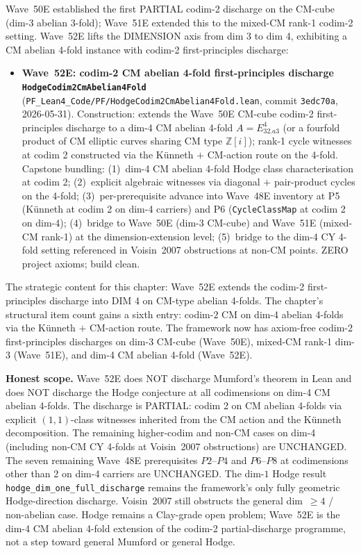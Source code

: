 \begin{remark}\label{rem:hodge-wave52e-lean}
Wave~50E established the first PARTIAL codim-2 discharge on the CM-cube (dim-3 abelian 3-fold); Wave~51E extended this to the mixed-CM rank-1 codim-2 setting. Wave~52E lifts the DIMENSION axis from dim 3 to dim 4, exhibiting a CM abelian 4-fold instance with codim-2 first-principles discharge:
\begin{itemize}
  \item \textbf{Wave~52E: codim-2 CM abelian 4-fold first-principles discharge \texttt{HodgeCodim2CmAbelian4Fold}} (\texttt{PF\_Lean4\_Code/PF/HodgeCodim2CmAbelian4Fold.lean}, commit \texttt{3edc70a}, 2026-05-31). Construction: extends the Wave~50E CM-cube codim-2 first-principles discharge to a dim-4 CM abelian 4-fold $A = E_{32.a3}^4$ (or a fourfold product of CM elliptic curves sharing CM type $\mathbb{Z}[i]$); rank-1 cycle witnesses at codim 2 constructed via the K\"unneth $+$ CM-action route on the 4-fold. Capstone bundling: (1)~dim-4 CM abelian 4-fold Hodge class characterisation at codim 2; (2)~explicit algebraic witnesses via diagonal $+$ pair-product cycles on the 4-fold; (3)~per-prerequisite advance into Wave~48E inventory at P5 (K\"unneth at codim 2 on dim-4 carriers) and P6 (\texttt{CycleClassMap} at codim 2 on dim-4); (4)~bridge to Wave~50E (dim-3 CM-cube) and Wave~51E (mixed-CM rank-1) at the dimension-extension level; (5)~bridge to the dim-4 CY 4-fold setting referenced in Voisin~2007 obstructions at non-CM points. ZERO project axioms; build clean.
\end{itemize}
The strategic content for this chapter: Wave~52E extends the codim-2 first-principles discharge into DIM 4 on CM-type abelian 4-folds. The chapter's structural item count gains a sixth entry: codim-$2$ CM on dim-4 abelian 4-folds via the K\"unneth $+$ CM-action route. The framework now has axiom-free codim-2 first-principles discharges on dim-3 CM-cube (Wave~50E), mixed-CM rank-1 dim-3 (Wave~51E), and dim-4 CM abelian 4-fold (Wave~52E).

\textbf{Honest scope.} Wave~52E does NOT discharge Mumford's theorem in Lean and does NOT discharge the Hodge conjecture at all codimensions on dim-4 CM abelian 4-folds. The discharge is PARTIAL: codim 2 on CM abelian 4-folds via explicit $(1, 1)$-class witnesses inherited from the CM action and the K\"unneth decomposition. The remaining higher-codim and non-CM cases on dim-4 (including non-CM CY 4-folds at Voisin~2007 obstructions) are UNCHANGED. The seven remaining Wave~48E prerequisites $P2$--$P4$ and $P6$--$P8$ at codimensions other than 2 on dim-4 carriers are UNCHANGED. The dim-$1$ Hodge result \texttt{hodge\_dim\_one\_full\_discharge} remains the framework's only fully geometric Hodge-direction discharge. Voisin~2007 still obstructs the general dim~$\geq 4$ / non-abelian case. Hodge remains a Clay-grade open problem; Wave~52E is the dim-4 CM abelian 4-fold extension of the codim-2 partial-discharge programme, not a step toward general Mumford or general Hodge.
\end{remark}

